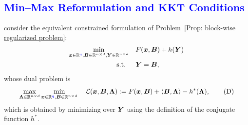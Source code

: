 
\subsection{\textcolor{blue}{Min--Max Reformulation and KKT Conditions}}
\label{Sec: first-order optimality conditions}
 consider the equivalent constrained formulation of Problem~\eqref{Prop: block-wise regularized problem}:
\begin{align}
\min_{\bm{x} \in \mathbb{R}^{{\color{blue}q}}, \bm{B} \in \mathbb{R}^{n\times d}, \bm{Y} \in \mathbb{R}^{n\times d}} &\quad F(\bm{x}, \bm{B}) + h(\bm{Y}) \notag \\
\text{s.t. } &\quad \bm{Y} = \bm{B}, \notag
\end{align}
whose dual problem is
\begin{equation}\label{Prop: the dual problem}
\max_{\bLmbd \in \RR^{n\times d}} \min_{\bx \in \RR^{\blue{q}}, \bB \in \RR^{n\times d}}\quad \calL(\bx,\bB,\bLmbd):=F(\bx,\bB)+\langle\bB,\bLmbd\rangle-h^*(\bLmbd), \tag{D}
\end{equation}
\begingroup\color{blue}
which is obtained by minimizing over $\bm{Y}$ using the definition of the conjugate function $h^*$.

